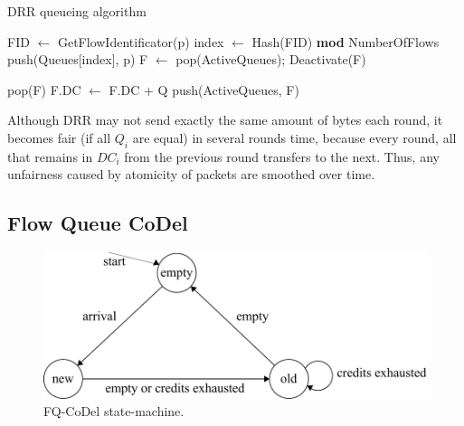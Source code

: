 \begin{algorithm}[H]
	\caption{DRR queueing algorithm}
	\label{alg:DRR_deq}
	\begin{algorithmic}
		\State FID $\leftarrow$ GetFlowIdentificator(p)
		\State index $\leftarrow$ Hash(FID) \textbf{mod} NumberOfFlows
		\State push(Queues[index], p)
		\State \Return
	\EndFunction
			\State F $\leftarrow$ pop(ActiveQueues);
				\State Deactivate(F)
				
					\State \Return pop(F)
			\Else {}
				\State F.DC $\leftarrow$ F.DC + Q
				\State push(ActiveQueues, F)
			\EndIf
		\EndWhile
	\EndFunction
	\end{algorithmic}
\end{algorithm}

Although DRR may not send exactly the same amount of bytes each round, it becomes fair (if all $Q_i$ are equal) in several rounds time, because every round, all that remains in $DC_i$ from the previous round transfers to the next. Thus, any unfairness caused by atomicity of packets are smoothed over time.

\subsection{Flow Queue CoDel}

\begin{figure}
	\centering
	\includegraphics[width=137mm]{drawings/fq_codel}
	\caption{FQ-CoDel state-machine.}
	\label{fig06:fqcodel}
\end{figure}

